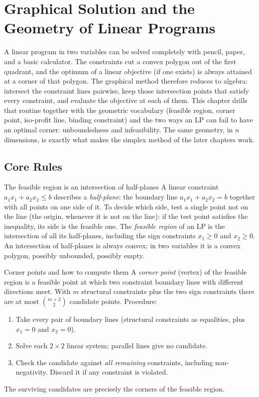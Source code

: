\chapter{Graphical Solution and the Geometry of Linear Programs}

A linear program in two variables can be solved completely with pencil,
paper, and a basic calculator. The constraints cut a convex polygon out of
the first quadrant, and the optimum of a linear objective (if one exists) is always attained at a corner of that polygon. The graphical method therefore reduces to algebra: intersect the
constraint lines pairwise, keep those intersection points that satisfy every
constraint, and evaluate the objective at each of them. This chapter drills
that routine together with the geometric vocabulary (feasible region,
corner point, iso-profit line, binding constraint) and the two ways an LP
can fail to have an optimal corner: unboundedness and infeasibility. The
same geometry, in $n$ dimensions, is exactly what makes the simplex method
of the later chapters work.

\section{Core Rules}

\begin{rulebox}{The feasible region is an intersection of half-planes}
A linear constraint $a_{1}x_{1}+a_{2}x_{2}\le b$ describes a
\emph{half-plane}: the boundary line
$a_{1}x_{1}+a_{2}x_{2}=b$ together with all points on one side of it. To
decide which side, test a single point not on the line (the origin, whenever
it is not on the line): if the test point satisfies the inequality, its side
is the feasible one. The \emph{feasible region}
of an LP is the intersection of all its half-planes, including the sign
constraints $x_{1}\ge 0$ and $x_{2}\ge 0$. An intersection of half-planes is
always convex; in two variables it is a convex polygon, possibly
unbounded, possibly empty.
\end{rulebox}

\begin{rulebox}{Corner points and how to compute them}
A \emph{corner point} (vertex) of the feasible region is a
feasible point at which two constraint boundary lines with different
directions meet. With $m$ structural constraints plus the two sign
constraints there are at most $\binom{m+2}{2}$ candidate points. Procedure:
\begin{enumerate}[leftmargin=1.8em,itemsep=0.3ex]
  \item Take every pair of boundary lines (structural constraints as
        equalities, plus $x_{1}=0$ and $x_{2}=0$).
  \item Solve each $2\times 2$ linear system; parallel lines give no
        candidate.
  \item Check the candidate against \emph{all remaining} constraints,
        including non-negativity. Discard it if any constraint is violated.
\end{enumerate}
The surviving candidates are precisely the corners of the feasible region.
\end{rulebox}

